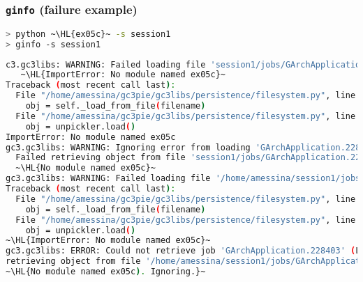 \documentclass[english,serif,mathserif,xcolor=pdftex,dvipsnames,table]{beamer}
\begin{document}
\begin{frame}[fragile]
  \frametitle{\texttt{ginfo} (failure example)}
  \begin{lstlisting}[language=sh,basicstyle=\tt\tiny]
> python ~\HL{ex05c}~ -s session1
> ginfo -s session1
\end{lstlisting}
\begin{lstlisting}[language=sh,basicstyle=\tt\tiny]
c3.gc3libs: WARNING: Failed loading file 'session1/jobs/GArchApplication.228403':
   ~\HL{ImportError: No module named ex05c}~
Traceback (most recent call last):
  File "/home/amessina/gc3pie/gc3libs/persistence/filesystem.py", line 115, in load
    obj = self._load_from_file(filename)
  File "/home/amessina/gc3pie/gc3libs/persistence/filesystem.py", line 92, in _load_from_file
    obj = unpickler.load()
ImportError: No module named ex05c
gc3.gc3libs: WARNING: Ignoring error from loading 'GArchApplication.228403':
  Failed retrieving object from file 'session1/jobs/GArchApplication.228403': ~\HL{ImportError: }~
  ~\HL{No module named ex05c}~
gc3.gc3libs: WARNING: Failed loading file '/home/amessina/session1/jobs/GArchApplication.228403': ImportError: No module named ex05c
Traceback (most recent call last):
  File "/home/amessina/gc3pie/gc3libs/persistence/filesystem.py", line 115, in load
    obj = self._load_from_file(filename)
  File "/home/amessina/gc3pie/gc3libs/persistence/filesystem.py", line 92, in _load_from_file
    obj = unpickler.load()
~\HL{ImportError: No module named ex05c}~
gc3.gc3libs: ERROR: Could not retrieve job 'GArchApplication.228403' (LoadError: Failed
retrieving object from file '/home/amessina/session1/jobs/GArchApplication.228403': ~\HL{ImportError: }~
~\HL{No module named ex05c). Ignoring.}~
  \end{lstlisting}
\end{frame}
\end{document}
